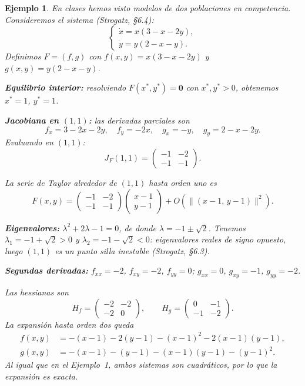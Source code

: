 \documentclass[11pt,letterpaper]{article}
\newtheorem{ejemplo}{Ejemplo}[section]
\begin{document}
\begin{ejemplo}
En clases hemos visto modelos de dos poblaciones en competencia.
Consideremos el sistema (Strogatz, \S6.4):
\[
  \begin{cases}
    \dot{x} = x(3 - x - 2y),\\[4pt]
    \dot{y} = y(2 - x - y).
  \end{cases}
\]
Definimos $F=(f,g)$ con $f(x,y)=x(3-x-2y)$ y $g(x,y)=y(2-x-y)$.

\textbf{Equilibrio interior:} resolviendo $F(x^*,y^*)=\mathbf{0}$ con
$x^*,y^*>0$, obtenemos $x^*=1$, $y^*=1$.

\textbf{Jacobiana en $(1,1)$:}
las derivadas parciales son
\[
  f_x = 3-2x-2y,\quad f_y = -2x,\quad
  g_x = -y,\quad g_y = 2-x-2y.
\]
Evaluando en $(1,1)$:
\[
  J_F(1,1) = \begin{pmatrix} -1 & -2\\ -1 & -1 \end{pmatrix}.
\]

La serie de Taylor alrededor de $(1,1)$ hasta orden uno es
\[
  F(x,y)
  = \begin{pmatrix} -1 & -2\\ -1 & -1 \end{pmatrix}
    \begin{pmatrix} x-1\\ y-1 \end{pmatrix}
  + O\!\left(\|(x-1,\,y-1)\|^2\right).
\]

\textbf{Eigenvalores:}
$\lambda^2+2\lambda-1=0$, de donde
$\lambda = -1 \pm \sqrt{2}$.
Tenemos $\lambda_1 = -1+\sqrt{2}>0$ y $\lambda_2=-1-\sqrt{2}<0$:
eigenvalores reales de signo opuesto, luego $(1,1)$ es un
\emph{punto silla} inestable (Strogatz, \S6.3).

\textbf{Segundas derivadas:}
$f_{xx}=-2$, $f_{xy}=-2$, $f_{yy}=0$;
$g_{xx}=0$, $g_{xy}=-1$, $g_{yy}=-2$.

Las hessianas son
\[
  H_f = \begin{pmatrix} -2 & -2\\ -2 & 0 \end{pmatrix},
  \qquad
  H_g = \begin{pmatrix} 0 & -1\\ -1 & -2 \end{pmatrix}.
\]
La expansión hasta orden dos queda
\begin{align*}
  f(x,y) &= -(x-1) - 2(y-1) - (x-1)^2 - 2(x-1)(y-1),\\
  g(x,y) &= -(x-1) - (y-1) - (x-1)(y-1) - (y-1)^2.
\end{align*}
Al igual que en el Ejemplo~1, ambos sistemas son cuadráticos, por lo que
la expansión es exacta.

\end{ejemplo}
\end{document}
